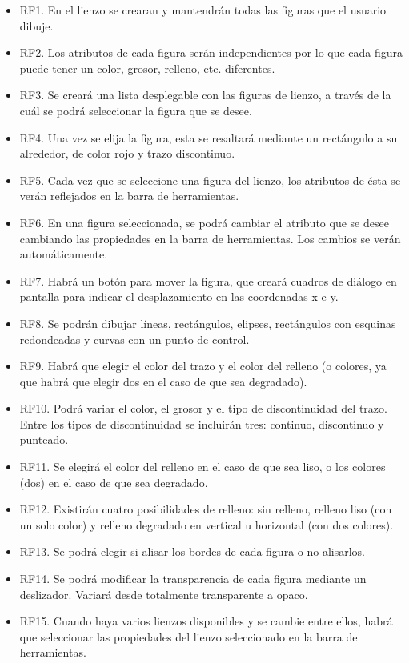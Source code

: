 \documentclass[11pt,a4paper]{article}
\begin{document}
\begin{itemize}
	\item RF1. En el lienzo se crearan y mantendrán todas las figuras que el usuario dibuje.
	\item RF2. Los atributos de cada figura serán independientes por lo que cada figura puede tener un color, grosor, relleno, etc. diferentes.
	\item RF3. Se creará una lista desplegable con las figuras de lienzo, a través de la cuál se podrá seleccionar la figura que se desee.
	\item RF4. Una vez se elija la figura, esta se resaltará mediante un rectángulo a su alrededor, de color rojo y trazo discontinuo.
	\item RF5. Cada vez que se seleccione una figura del lienzo, los atributos de ésta se verán reflejados en la barra de herramientas.
	\item RF6. En una figura seleccionada, se podrá cambiar el atributo que se desee cambiando las propiedades en la barra de herramientas. Los cambios se verán automáticamente.
	\item RF7. Habrá un botón para mover la figura, que creará cuadros de diálogo en pantalla para indicar el desplazamiento en las coordenadas x e y.
	\item RF8. Se podrán dibujar líneas, rectángulos, elipses, rectángulos con esquinas redondeadas y curvas con un punto de control.
	\item RF9. Habrá que elegir el color del trazo y el color del relleno (o colores, ya que habrá que elegir dos en el caso de que sea degradado).
	\item RF10. Podrá variar el color, el grosor y el tipo de discontinuidad del trazo. Entre los tipos de discontinuidad se incluirán tres: continuo, discontinuo y punteado.
	\item RF11. Se elegirá el color del relleno en el caso de que sea liso, o los colores (dos) en el caso de que sea degradado.
	\item RF12. Existirán cuatro posibilidades de relleno: sin relleno, relleno liso (con un solo color) y relleno degradado en vertical u horizontal (con dos colores).
	\item RF13. Se podrá elegir si alisar los bordes de cada figura o no alisarlos.
	\item RF14. Se podrá modificar la transparencia de cada figura mediante un deslizador. Variará desde totalmente transparente a opaco.
	\item RF15. Cuando haya varios lienzos disponibles y se cambie entre ellos, habrá que seleccionar las propiedades del lienzo seleccionado en la barra de herramientas.
\end{itemize}
\end{document}
